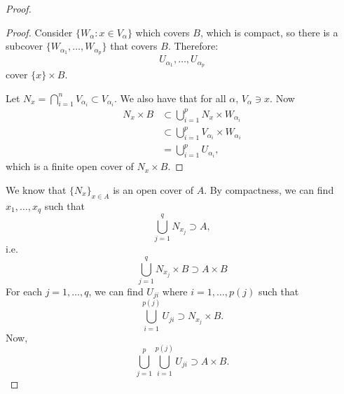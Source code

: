 \begin{itemize}
\begin{proof}
\begin{lemma}
\begin{proof}
                      Consider $\{W_\alpha: x \in V_\alpha\}$ which covers $B$, which is compact, so there is a subcover $\{W_{\alpha_1},\dots,W_{\alpha_p}\}$ that covers $B$. Therefore:
                      \begin{equation}
                          U_{\alpha_1},\dots,U_{\alpha_p}
                      \end{equation}
                      cover $\{x\}\times B$.
                      \vspace{2mm}

                      Let $N_x = \bigcap_{i=1}^n V_{\alpha_i} \subset V_{\alpha_i}$. We also have that for all $\alpha$, $V_\alpha \ni x$. Now
                      \begin{align}
                          N_x \times B & \subset \bigcup_{i=1}^p N_x \times W_{\alpha_i}         \\
                                       & \subset \bigcup_{i=1}^p V_{\alpha_i}\times W_{\alpha_i} \\
                                       & = \bigcup_{i=1}^p U_{\alpha_i},
                      \end{align}
                      which is a finite open cover of $N_x\times B$.
                  \end{proof}
              \end{lemma}
              We know that $\{N_x\}_{x\in A}$ is an open cover of $A$. By compactness, we can find $x_1,\dots,x_q$ such that
              \begin{equation}
                  \bigcup_{j=1}^q N_{x_j} \supset A,
              \end{equation}
              i.e.
              \begin{equation}
                  \bigcup_{j=1}^q N_{x_j}\times B \supset A\times B
              \end{equation}
              For each $j=1,\dots,q$, we can find $U_{ji}$ where $i=1,\dots,p(j)$ such that
              \begin{equation}
                  \bigcup_{i=1}^{p(j)} U_{ji}\supset N_{x_j}\times B.
              \end{equation}
              Now,
              \begin{equation}
                  \bigcup_{j=1}^p \bigcup_{i=1}^{p(j)}U_{ji} \supset A\times B.
              \end{equation}
          \end{proof}


\end{itemize}

